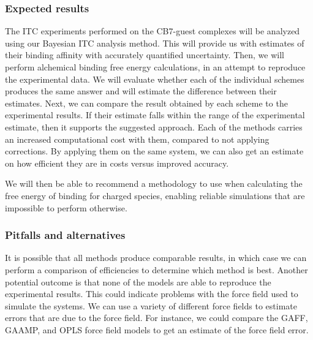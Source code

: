 \documentclass[10pt,final]{article}
\begin{document}
\subsubsection*{Expected results}
The ITC experiments performed on the CB7-guest complexes will be analyzed using our Bayesian ITC analysis method.
%
This will provide us with estimates of their binding affinity with accurately quantified uncertainty. 
%
Then, we will perform alchemical binding free energy calculations, in an attempt to reproduce the experimental data.
%
We will evaluate whether each of the individual schemes produces the same answer and will estimate the difference between their estimates. 
%
Next, we can compare the result obtained by each scheme to the experimental results. If their estimate falls within the range of the experimental estimate, then it supports the suggested approach.
%
Each of the methods carries an increased computational cost with them, compared to not applying corrections.
%
By applying them on the same system, we can also get an estimate on how efficient they are in costs versus improved accuracy.

We will then be able to recommend a methodology to use when calculating the free energy of binding for charged species, enabling reliable simulations that are impossible to perform otherwise.

\subsubsection*{Pitfalls and alternatives}

It is possible that all methods produce comparable results, in which case we can perform a comparison of efficiencies to determine which method is best.
%
Another potential outcome is that none of the models are able to reproduce the experimental results.
%
This could indicate problems with the force field used to simulate the systems.
%
We can use a variety of different force fields to estimate errors that are due to the force field.
%
For instance, we could compare the GAFF\cite{Wang2004a}, GAAMP\cite{Huang2013a}, and OPLS\cite{Schroedinger2014b} force field models to get an estimate of the force field error. 
\end{document}

